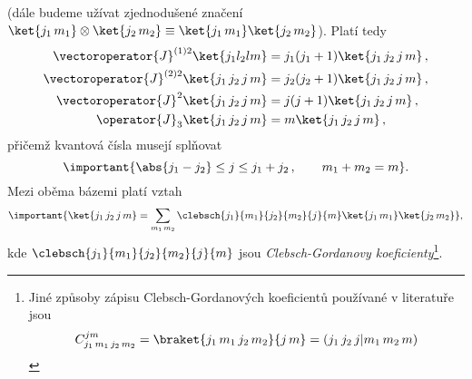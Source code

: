 (dále budeme užívat zjednodušené značení $\ket{j_{1}\,m_{1}}\otimes\ket{j_{2}\,m_{2}}
\equiv\ket{j_{1}\,m_{1}}\ket{j_{2}\,m_{2}}$).
Platí tedy
\begin{subequations}
    \begin{align}
        \vectoroperator{J}^{(1)2}\ket{j_{1}l_{2}lm}
            &=j_{1}(j_{1}+1)\ket{j_{1}\,j_{2}\,j\,m}\,,\\
        \vectoroperator{J}^{(2)2}\ket{j_{1}\,j_{2}\,j\,m}
            &=j_{2}(j_{2}+1)\ket{j_{1}\,j_{2}\,j\,m}\,,\\
        \vectoroperator{J}^{2}\ket{j_{1}\,j_{2}\,j\,m}
            &=j(j+1)\ket{j_{1}\,j_{2}\,j\,m}\,,\\
        \operator{J}_{3}\ket{j_{1}\,j_{2}\,j\,m}
            &=m\ket{j_{1}\,j_{2}\,j\,m}\,,
    \end{align}
\end{subequations}
přičemž kvantová čísla musejí splňovat
\begin{equation}
    \label{eq:AngularMomentumSelectionRules}
    \important{\abs{j_{1}-j_{2}}\leq j\leq j_{1}+j_{2}\,,\qquad m_{1}+m_{2}=m}.
\end{equation}
Mezi oběma bázemi platí vztah
\begin{equation}
    \important{
        \ket{j_{1}\,j_{2}\,j\,m}
            =\sum_{m_{1}\,m_{2}}\clebsch{j_{1}}{m_{1}}{j_{2}}{m_{2}}{j}{m}
                \ket{j_{1}\,m_{1}}\ket{j_{2}\,m_{2}}
    },
\end{equation}
kde $\clebsch{j_{1}}{m_{1}}{j_{2}}{m_{2}}{j}{m}$ 
jsou \emph{Clebsch-Gordanovy koeficienty}\footnote{
    Jiné způsoby zápisu Clebsch-Gordanových koeficientů používané v literatuře jsou
    \begin{equation}
            C^{jm}_{j_{1}\,m_{1}\,j_{2}\,m_{2}}
            =\braket{j_{1}\,m_{1}\,j_{2}\,m_{2}}{j\,m}
            =\left(j_{1}\,j_{2}\,j|m_{1}\,m_{2}\,m\right)
    \end{equation}
}.
